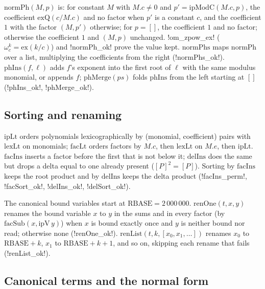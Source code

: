 \begin{definition}
$\mathrm{normPh}(M,p)$ is: for constant $M$ with $M.c\neq0$ and $p'=\mathrm{ipModC}(M.c,p)$, the coefficient $\mathrm{exQ}(c/M.c)$ and no factor when $p'$ is a constant $c$, and the coefficient $1$ with the factor $(M,p')$ otherwise; for $p=[]$, the coefficient $1$ and no factor; otherwise the coefficient $1$ and $(M,p)$ unchanged. \lean!om_zpow_ex! ($\omega_c^k=\mathrm{ex}(k/c)$) and \lean!normPh_ok! prove the value kept. $\mathrm{normPhs}$ maps $\mathrm{normPh}$ over a list, multiplying the coefficients from the right (\lean!normPhs_ok!). $\mathrm{phIns}(f,\ell)$ adds $f$'s exponent into the first root of $\ell$ with the same modulus monomial, or appends $f$; $\mathrm{phMerge}(ps)$ folds $\mathrm{phIns}$ from the left starting at $[]$ (\lean!phIns_ok!, \lean!phMerge_ok!).
\end{definition}

\subsection{Sorting and renaming}

$\mathrm{ipLt}$ orders polynomials lexicographically by (monomial, coefficient) pairs with $\mathrm{lexLt}$ on monomials; $\mathrm{facLt}$ orders factors by $M.c$, then $\mathrm{lexLt}$ on $M.e$, then $\mathrm{ipLt}$. $\mathrm{facIns}$ inserts a factor before the first that is not below it; $\mathrm{delIns}$ does the same but drops a delta equal to one already present ($[P]^2=[P]$). Sorting by $\mathrm{facIns}$ keeps the root product and by $\mathrm{delIns}$ keeps the delta product (\lean!facIns_perm!, \lean!facSort_ok!, \lean!delIns_ok!, \lean!delSort_ok!).

\begin{definition}[Renaming]
The canonical bound variables start at $\mathrm{RBASE}=2\,000\,000$. $\mathrm{renOne}(t,x,y)$ renames the bound variable $x$ to $y$ in the sums and in every factor (by $\mathrm{facSub}(x,\mathrm{ipV}\,y)$) when $x$ is bound exactly once and $y$ is neither bound nor read; otherwise $\mathrm{none}$ (\lean!renOne_ok!). $\mathrm{renList}(t,k,[x_0,x_1,\dots])$ renames $x_0$ to $\mathrm{RBASE}+k$, $x_1$ to $\mathrm{RBASE}+k+1$, and so on, skipping each rename that fails (\lean!renList_ok!).
\end{definition}

\subsection{Canonical terms and the normal form}

